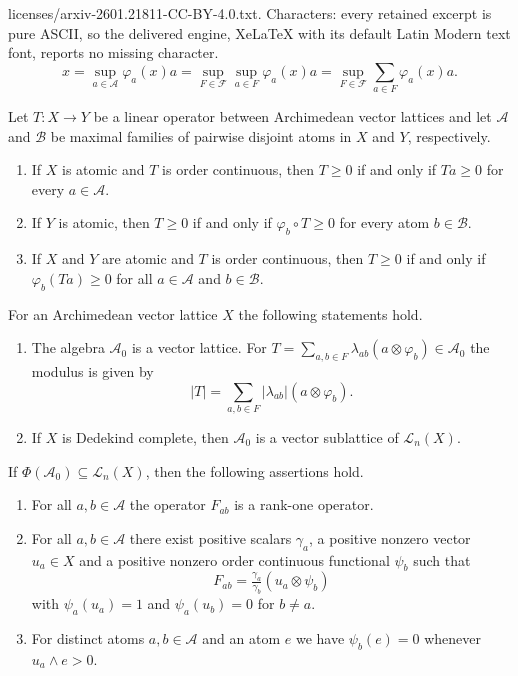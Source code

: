 \documentclass[10pt,a4paper]{amsart}
\begin{document}
licenses/arxiv-2601.21811-CC-BY-4.0.txt. Characters: every retained excerpt is pure ASCII, so the delivered engine, XeLaTeX with its default Latin Modern text font, reports no missing character.
\begin{equation}\label{zapis z atomi}
x=\sup_{a\in \mathcal A}\varphi_a(x)a=\sup_{F\in \mathcal F}\sup_{a\in F}\varphi_a(x)a=\sup_{F\in \mathcal F}\sum_{a\in F}\varphi_a(x)a. 
\end{equation}

\begin{lemma}\label{nicelni operator atomi}
Let $T\colon X\to Y$ be a linear operator between Archimedean vector lattices and let $\mathcal A$ and $\mathcal B$ be maximal families of pairwise disjoint atoms in $X$ and $Y$, respectively.
\begin{enumerate}
\item If $X$ is atomic and $T$ is order continuous, then $T\geq 0$ if and only if $Ta\geq 0$ for every $a\in \mathcal A$.  
\item If $Y$ is atomic, then $T\geq 0$ if and only if $\varphi_b\circ T\geq 0$ for every atom $b\in \mathcal B$.
\item If $X$ and $Y$ are atomic and $T$ is order continuous, then $T\geq 0$ if and only if $\varphi_b(Ta)\geq 0$ for all $a\in \mathcal A$
 and $b\in \mathcal B$.
\end{enumerate}
\end{lemma}

\begin{proposition}\label{A_0 mreza}
    For an Archimedean vector lattice $X$ the following statements hold.
    \begin{enumerate}
        \item The algebra $\mathscr A_0$ is a vector lattice. For $T=\sum_{a,b\in F}\lambda_{ab}(a\otimes \varphi_b)\in \mathscr A_0$ the modulus is given by 
        $$|T|=\sum_{a,b\in F}|\lambda_{ab}|(a\otimes \varphi_b).$$
        \item If $X$ is Dedekind complete, then $\mathscr A_0$ is a vector sublattice of $\mathscr L_n(X)$.
    \end{enumerate}
\end{proposition}

\begin{lemma}\label{lema o delti}
If $\Phi(\mathscr A_0)\subseteq \mathscr L_n(X)$, then the following assertions hold.
\begin{enumerate}
\item For all $a,b\in \mathcal A$ the operator $F_{ab}$ is a rank-one operator.
\item For all $a,b\in \mathcal A$ there exist positive scalars $\gamma_a$, a positive nonzero vector $u_a\in X$ and a positive nonzero order continuous functional $\psi_b$ such that
    $$F_{ab}=\tfrac{\gamma_a}{\gamma_b} (u_a\otimes \psi_b)$$
    with $\psi_a(u_a)=1$ and $\psi_a(u_b)=0$ for $b\neq a$.
\item For distinct atoms $a,b\in \mathcal A$ and an atom $e$ we have $\psi_b(e)=0$ whenever $u_a\wedge e >0$.
\end{enumerate}
\end{lemma}
\end{document}
